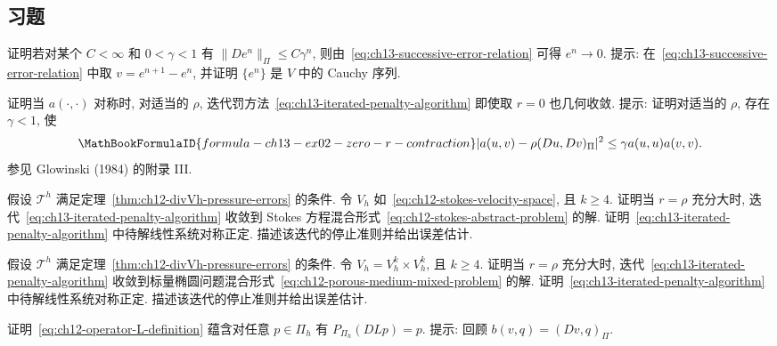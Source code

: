 \subsection{习题}
\label{sec:ch13-exercises}
\setcounter{exerciseitem}{0}

\begin{MBExercise}
\label{exr:ch13-cauchy-error-sequence}
证明若对某个 $C<\infty$ 和 $0<\gamma<1$ 有 $\|De^n\|_\Pi\leq C\gamma^n$, 则由~\eqref{eq:ch13-successive-error-relation} 可得 $e^n\to0$. 提示: 在~\eqref{eq:ch13-successive-error-relation} 中取 $v=e^{n+1}-e^n$, 并证明 $\{e^n\}$ 是 $V$ 中的 Cauchy 序列.
\end{MBExercise}

\begin{MBExercise}
\label{exr:ch13-zero-r-iterated-penalty}
证明当 $a(\cdot,\cdot)$ 对称时, 对适当的 $\rho$, 迭代罚方法~\eqref{eq:ch13-iterated-penalty-algorithm} 即使取 $r=0$ 也几何收敛. 提示: 证明对适当的 $\rho$, 存在 $\gamma<1$, 使
\[
\MathBookFormulaID{formula-ch13-ex02-zero-r-contraction}
|a(u,v)-\rho(Du,Dv)_\Pi|^2
\leq\gamma a(u,u)a(v,v).
\]
参见 Glowinski (1984) 的附录 III.
\end{MBExercise}

\begin{MBExercise}
\label{exr:ch13-stokes-iterated-penalty}
假设 $\mathcal T^h$ 满足定理~\ref{thm:ch12-divVh-pressure-errors} 的条件. 令 $V_h$ 如~\eqref{eq:ch12-stokes-velocity-space}, 且 $k\geq4$. 证明当 $r=\rho$ 充分大时, 迭代~\eqref{eq:ch13-iterated-penalty-algorithm} 收敛到 Stokes 方程混合形式~\eqref{eq:ch12-stokes-abstract-problem} 的解. 证明~\eqref{eq:ch13-iterated-penalty-algorithm} 中待解线性系统对称正定. 描述该迭代的停止准则并给出误差估计.
\end{MBExercise}

\begin{MBExercise}
\label{exr:ch13-scalar-elliptic-iterated-penalty}
假设 $\mathcal T^h$ 满足定理~\ref{thm:ch12-divVh-pressure-errors} 的条件. 令 $V_h=V_h^k\times V_h^k$, 且 $k\geq4$. 证明当 $r=\rho$ 充分大时, 迭代~\eqref{eq:ch13-iterated-penalty-algorithm} 收敛到标量椭圆问题混合形式~\eqref{eq:ch12-porous-medium-mixed-problem} 的解. 证明~\eqref{eq:ch13-iterated-penalty-algorithm} 中待解线性系统对称正定. 描述该迭代的停止准则并给出误差估计.
\end{MBExercise}

\begin{MBExercise}
\label{exr:ch13-projected-right-inverse}
证明~\eqref{eq:ch12-operator-L-definition} 蕴含对任意 $p\in\Pi_h$ 有 $P_{\Pi_h}(DLp)=p$. 提示: 回顾 $b(v,q)=(Dv,q)_\Pi$.
\end{MBExercise}

